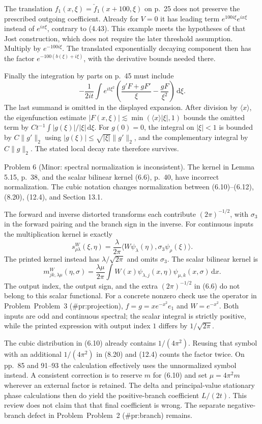 \documentclass[10pt]{article}
\begin{document}
The translation \(f_1(x,\xi)=\check f_1(x+100,\xi)\) on p. 25 does not preserve the prescribed outgoing coefficient. Already for \(V=0\) it has leading term \(e^{100i\xi}e^{ix\xi}\) instead of \(e^{ix\xi}\), contrary to (4.43). This example meets the hypotheses of that Jost construction, which does not require the later threshold assumption. Multiply by \(e^{-100i\xi}\). The translated exponentially decaying component then has the factor \(e^{-100(b(\xi)+i\xi)}\), with the derivative bounds needed there.\par
Finally the integration by parts on p. 45 must include \[-\frac1{2it}\int e^{it\xi^2}
 \left(\frac{g'F+gF'}{\xi}-\frac{gF}{\xi^2}\right)\,\mathrm d\xi .\] The last summand is omitted in the displayed expansion. After division by \(\langle x\rangle\), the eigenfunction estimate \(|F(x,\xi)|\lesssim\min(\langle x\rangle|\xi|,1)\) bounds the omitted term by \(C t^{-1}\int |g(\xi)|/|\xi|\,\mathrm d\xi\). For \(g(0)=0\), the integral on \(|\xi|<1\) is bounded by \(C\|g'\|_2\) using \(|g(\xi)|\le\sqrt{|\xi|}\|g'\|_2\), and the complementary integral by \(C\|g\|_2\). The stated local decay rate therefore survives.\par
Problem 6 (Minor: spectral normalization is inconsistent).  The kernel in Lemma 5.15, p. 38, and the scalar bilinear kernel (6.6), p. 40, have incorrect normalization. The cubic notation changes normalization between (6.10)–(6.12), (8.20), (12.4), and Section 13.1.\par
The forward and inverse distorted transforms each contribute \((2\pi)^{-1/2}\), with \(\sigma_3\) in the forward pairing and the branch sign in the inverse. For continuous inputs the multiplication kernel is exactly \[s^W_{\rho\lambda}(\xi,\eta)
 =\frac{\lambda}{2\pi}
   \langle W\psi_\lambda(\eta),\sigma_3\psi_\rho(\xi)\rangle.\] The printed kernel instead has \(\lambda/\sqrt{2\pi}\) and omits \(\sigma_3\). The scalar bilinear kernel is \[m^W_{jk,\lambda\mu}(\eta,\sigma)
 =\frac{\lambda\mu}{2\pi}
   \int W(x)\psi_{\lambda,j}(x,\eta)
                    \psi_{\mu,k}(x,\sigma)\,\mathrm dx .\] The output index, the output sign, and the extra \((2\pi)^{-1/2}\) in (6.6) do not belong to this scalar functional. For a concrete nonzero check use the operator in Problem Problem 3 (\#pr:projection), \(f=g=xe^{-x^2}e_1\) and \(W=e^{-x^2}\). Both inputs are odd and continuous spectral; the scalar integral is strictly positive, while the printed expression with output index \(1\) differs by \(1/\sqrt{2\pi}\).\par
The cubic distribution in (6.10) already contains \(1/(4\pi^2)\). Reusing that symbol with an additional \(1/(4\pi^2)\) in (8.20) and (12.4) counts the factor twice. On pp. 85 and 91–93 the calculation effectively uses the unnormalized symbol instead. A consistent correction is to reserve \(m\) for (6.10) and set \(\mu=4\pi^2m\) wherever an external factor is retained. The delta and principal-value stationary phase calculations then do yield the positive-branch coefficient \(L/(2t)\). This review does not claim that that final coefficient is wrong. The separate negative-branch defect in Problem Problem 2 (\#pr:branch) remains.\par
\end{document}
